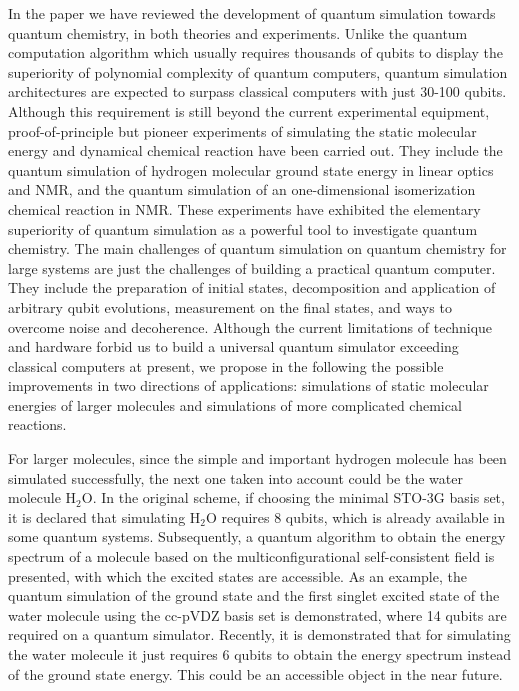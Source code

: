 \documentclass[8.5pt,twoside,twocolumn]{article}
\begin{document}
In the paper we have reviewed the development of quantum simulation
towards quantum chemistry, in both theories and experiments.
Unlike the quantum computation algorithm which usually requires
thousands of qubits to display the superiority of polynomial
complexity of quantum computers,
quantum simulation architectures are expected to
surpass classical computers with just 30-100 qubits.
Although this requirement is still beyond the current
experimental equipment, proof-of-principle but pioneer experiments of simulating the static molecular energy\cite{Alan_first}
and dynamical chemical reaction \cite{Simulating_chemistry_computer} have been carried out. They include 
the quantum simulation of hydrogen molecular ground state energy
in linear optics\cite{Optics_static} and NMR,\cite{NMR_static}
and the quantum simulation of an one-dimensional isomerization
chemical reaction in NMR.\cite{NMR_dynamic}
These experiments have exhibited the elementary superiority
of quantum simulation as a powerful tool
to investigate quantum chemistry.
The main challenges of quantum simulation on quantum chemistry
for large systems are just the challenges
of building a practical quantum computer.
They include the preparation of initial states,
decomposition and application of arbitrary qubit evolutions,
measurement on the final states,
and ways to overcome noise and decoherence.
Although the current limitations of technique and hardware forbid us
to build a universal quantum simulator exceeding classical computers at present,
we propose in the following the possible improvements
in two directions of applications:
simulations of static molecular energies of larger molecules
and simulations of more complicated chemical reactions.

For larger molecules, since the simple and important hydrogen
molecule has been simulated successfully,
the next one taken into account could be the water molecule H$_2$O.
In the original scheme,\cite{Alan_first}
if choosing the minimal STO-3G basis set,
it is declared that simulating H$_2$O requires 8 qubits,
which is already available in some quantum systems.
Subsequently, a quantum algorithm to obtain the energy spectrum of a
molecule based on the multiconfigurational self-consistent field
is presented,\cite{water_static} with which the excited states are accessible.
As an example, the quantum simulation of the ground state
and the first singlet excited state of the water molecule
using the cc-pVDZ basis set\cite{ccpv} is demonstrated,
where 14 qubits are required on a quantum simulator. Recently, it is demonstrated that  for simulating the water molecule it just requires 6 qubits to obtain the energy spectrum instead of the ground state energy.\cite{water}
This could be an accessible object in the near future.
\end{document}
